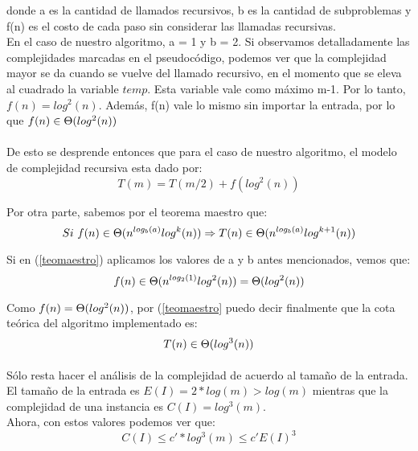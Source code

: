 donde a es la cantidad de llamados recursivos, b es la cantidad de subproblemas y f(n) es el costo de cada paso sin considerar las llamadas recursivas.\\
En el caso de nuestro algoritmo, a = 1 y b = 2. Si observamos detalladamente las complejidades marcadas en el pseudocódigo, podemos ver que la complejidad mayor se da cuando se vuelve del llamado recursivo, en el momento que se eleva al cuadrado la variable $temp$. Esta variable vale como máximo m-1. Por lo tanto, $f(n) = log^{2}(n)$. Además, f(n) vale lo mismo sin importar la entrada, por lo que $f(n) \in \Theta(log^{2}(n))$

\paragraph{}
De esto se desprende entonces que para el caso de nuestro algoritmo, el modelo de complejidad recursiva esta dado por:
\begin{equation}
	T(m) = T(m/2) + f(log^{2}(n))
	\label{comprecursiva}
\end{equation}

Por otra parte, sabemos por el teorema maestro que:
\begin{equation}
	Si\ f(n) \in \Theta(n^{log_{b}(a)}log^{k}(n)) \Rightarrow T(n) \in \Theta(n^{log_{b}(a)}log^{k+1}(n))
	\label{teomaestro}
\end{equation}

Si en (\ref{teomaestro}) aplicamos los valores de a y b antes mencionados, vemos que:
\begin{equation}
	f(n) \in \Theta(n^{log_{2}(1)}log^{2}(n)) = \Theta(log^{2}(n))
	\label{compalgoritmo}
\end{equation}

Como $f(n) = \Theta(log^{2}(n))$, por (\ref{teomaestro} puedo decir finalmente que la cota teórica del algoritmo implementado es:
\begin{equation}
	T(n) \in \Theta(log^{3}(n))
	\label{teomaestro}
\end{equation}

\paragraph{}
Sólo resta hacer el análisis de la complejidad de acuerdo al tamaño de la entrada. El tamaño de la entrada es $E(I) = 2*log(m) > log(m)$ mientras que la complejidad de una instancia es $C(I) = log^{3}(m)$.\\
Ahora, con estos valores podemos ver que:
\begin{equation}
	C(I) \leq c' * log^{3}(m) \leq c' E(I)^{3}
\end{equation}

